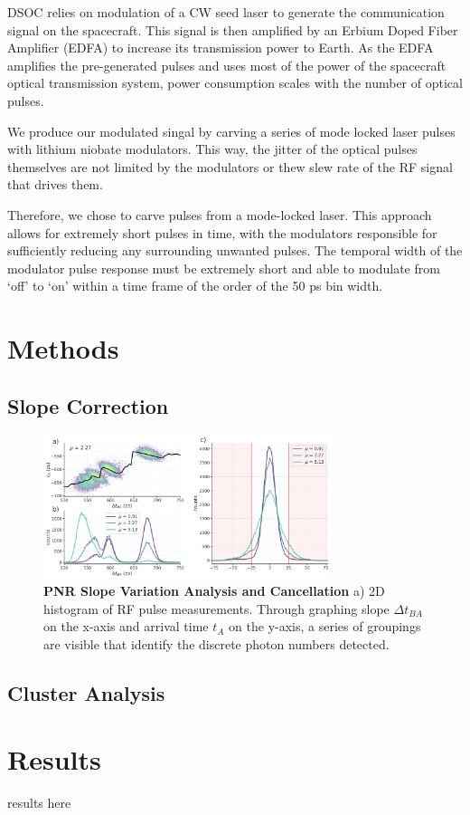 \documentclass{optica-article}
\begin{document}
DSOC relies on modulation of a CW seed laser to generate the communication signal on the spacecraft. This signal is then amplified by an Erbium Doped Fiber Amplifier (EDFA) to increase its transmission power to Earth. As the EDFA amplifies the pre-generated pulses and uses most of the power of the spacecraft optical transmission system, power consumption scales with the number of optical pulses.

We produce our modulated singal by carving a series of mode locked laser pulses with lithium niobate modulators. This way, the jitter of the optical pulses themselves are not limited by the modulators or thew slew rate of the RF signal that drives them.

Therefore, we chose to carve pulses from a mode-locked laser. This approach allows for extremely short pulses in time, with the modulators responsible for sufficiently reducing any surrounding unwanted pulses. The temporal width of the modulator pulse response must be extremely short and able to modulate from `off' to `on' within a time frame of the order of the 50 ps bin width.

\hypertarget{methods}{%
\section{Methods}\label{methods}}

\hypertarget{slope-correction}{%
\subsection{Slope Correction}\label{slope-correction}}

\hypertarget{fig:slope-correction}{%
\begin{figure}
\centering
\includegraphics[width=0.75\textwidth]{./figs_03/slope_cancellation_light.pdf}
\caption[{PNR Slope Variation Analysis and Cancellation}]{\textbf{PNR Slope Variation Analysis and Cancellation} a) 2D histogram of RF pulse measurements. Through graphing slope $\Delta t_{BA}$ on the x-axis and arrival time $t_A$ on the y-axis, a series of groupings are visible that identify the discrete photon numbers detected.}
\label{fig:slope-correction}
\end{figure}
}

\hypertarget{cluster-analysis}{%
\subsection{Cluster Analysis}\label{cluster-analysis}}

\hypertarget{results}{%
\section{Results}\label{results}}

results here

{}



\end{document}
